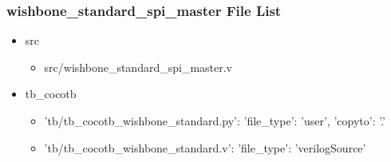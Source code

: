 \subsubsection{wishbone\_standard\_spi\_master File List}
\begin{itemize}
\item src
	\begin{itemize}
	\item src/wishbone\_standard\_spi\_master.v
	\end{itemize}
\item tb\_cocotb
	\begin{itemize}
	\item {'tb/tb\_cocotb\_wishbone\_standard.py': {'file\_type': 'user', 'copyto': '.'}}
	\item {'tb/tb\_cocotb\_wishbone\_standard.v': {'file\_type': 'verilogSource'}}
	\end{itemize}
\end{itemize}
